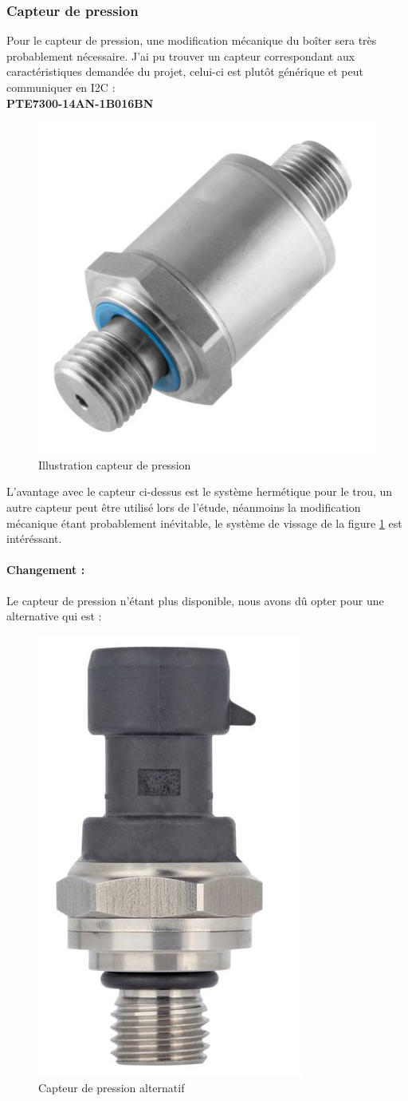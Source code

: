 {\clearpage

\subsubsection{Capteur de pression}
{
Pour le capteur de pression, une modification mécanique du boîter sera très probablement nécessaire. J'ai pu trouver un capteur correspondant aux caractéristiques demandée du projet, celui-ci est plutôt générique et peut communiquer en I2C : \\
\textbf{PTE7300-14AN-1B016BN}

\begin{figure}[h] 
    \centering
    \includegraphics[width=.3\textwidth]{Figures/Capteur-pression}
    \caption{Illustration capteur de pression}
    \label{fig:CaptPress}
\end{figure}

L'avantage avec le capteur ci-dessus est le système hermétique pour le trou, un autre capteur peut être utilisé lors de l'étude, néanmoins la modification mécanique étant probablement inévitable, le système de vissage de la figure \ref{fig:CaptPress} est intéréssant.

\paragraph{Changement :} Le capteur de pression n'étant plus disponible, nous avons dû opter pour une alternative qui est :

\begin{figure}[h]
	\centering
	\includegraphics[width=0.2\linewidth]{Figures/Capteur-pression_2}
	\caption{Capteur de pression alternatif}
	\label{fig:capteur-pression2}
\end{figure}


}}
